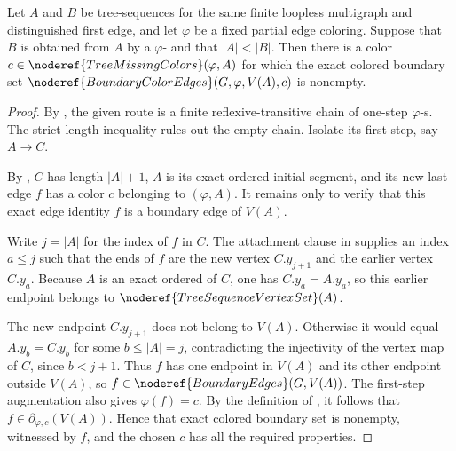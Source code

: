 \begin{lemma}
Let \(A\) and \(B\) be tree-sequences for the same finite loopless
multigraph and distinguished first edge, and let \(\varphi\) be a fixed
partial edge coloring.  Suppose that \(B\) is obtained from \(A\) by a
\(\varphi\)- and that
\(|A|<|B|\).  Then there is a color
\(c\in\noderef{TreeMissingColors}(\varphi,A)\) for which the exact colored
boundary set
\(\noderef{BoundaryColorEdges}(G,\varphi,V(A),c)\) is nonempty.
\end{lemma}
\begin{proof}
By , the given route is a finite
reflexive-transitive chain of one-step
\(\varphi\)-s.  The strict length inequality
rules out the empty chain.  Isolate its first step, say \(A\to C\).

By , \(C\) has length \(|A|+1\), \(A\) is
its exact ordered initial segment, and its new last edge \(f\) has a color
\(c\) belonging to \((\varphi,A)\).  It remains
only to verify that this exact edge identity \(f\) is a boundary edge of
\(V(A)\).

Write \(j=|A|\) for the index of \(f\) in \(C\).  The attachment clause in
 supplies an index \(a\leq j\) such that the ends of
\(f\) are the new vertex \(C.y_{j+1}\) and the earlier vertex \(C.y_a\).
Because \(A\) is an exact ordered
 of \(C\), one has
\(C.y_a=A.y_a\), so this earlier endpoint belongs to
\(\noderef{TreeSequenceVertexSet}(A)\).

The new endpoint \(C.y_{j+1}\) does not belong to \(V(A)\).  Otherwise it
would equal \(A.y_b=C.y_b\) for some \(b\leq |A|=j\), contradicting the
injectivity of the vertex map of \(C\), since \(b<j+1\).  Thus \(f\) has
one endpoint in \(V(A)\) and its other endpoint outside \(V(A)\), so
\(f\in\noderef{BoundaryEdges}(G,V(A))\).  The first-step augmentation also
gives \(\varphi(f)=c\).  By the definition of
, it follows that
\(f\in\partial_{\varphi,c}(V(A))\).  Hence that exact colored boundary
set is nonempty, witnessed by \(f\), and the chosen \(c\) has all the
required properties.
\end{proof}
